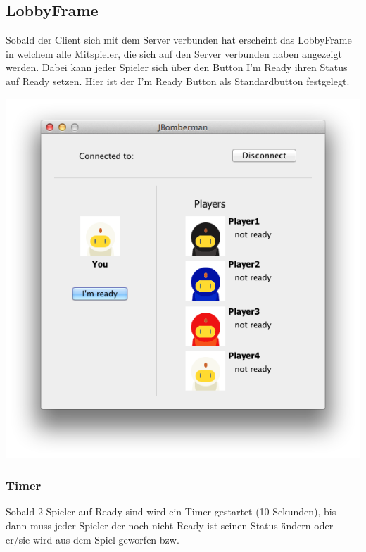 \documentclass[11pt]{scrartcl}
\begin{document}
\subsection{LobbyFrame}

Sobald der Client sich mit dem Server verbunden hat erscheint das LobbyFrame in welchem alle Mitspieler, die sich auf den Server verbunden haben angezeigt werden.
Dabei kann jeder Spieler sich über den Button I'm Ready ihren Status auf Ready setzen.
Hier ist der I'm Ready Button als Standardbutton festgelegt. 

\includegraphics[scale=0.45]{Lobby}

\subsubsection{Timer}
Sobald 2 Spieler auf Ready sind wird ein Timer gestartet (10 Sekunden), bis dann 
muss jeder Spieler der noch nicht Ready ist seinen Status ändern oder er/sie 
wird aus dem Spiel geworfen bzw.
\end{document}
